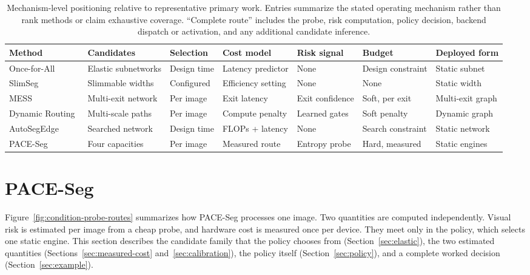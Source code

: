 \documentclass[a4paper,5p]{elsarticle}
\newcommand{\method}{PACE-Seg}
\begin{document}
\begin{table}[!t]
\centering
\caption{Mechanism-level positioning relative to representative primary work. Entries summarize the stated operating mechanism rather than rank methods or claim exhaustive coverage. ``Complete route'' includes the probe, risk computation, policy decision, backend dispatch or activation, and any additional candidate inference.}
\label{tab:related-positioning}
\footnotesize
\setlength{\tabcolsep}{3pt}
\begin{tabular*}{\textwidth}{@{\extracolsep{\fill}}lllllll@{}}
\toprule
Method & Candidates & Selection & Cost model & Risk signal & Budget & Deployed form \\
\midrule
Once-for-All~\cite{cai2020ofa} & Elastic subnetworks & Design time & Latency predictor & None & Design constraint & Static subnet \\
SlimSeg~\cite{xue2022slimseg} & Slimmable widths & Configured & Efficiency setting & None & None & Static width \\
MESS~\cite{kouris2022mess} & Multi-exit network & Per image & Exit latency & Exit confidence & Soft, per exit & Multi-exit graph \\
Dynamic Routing~\cite{li2020dynamic} & Multi-scale paths & Per image & Compute penalty & Learned gates & Soft penalty & Dynamic graph \\
AutoSegEdge~\cite{dou2023autosegedge} & Searched network & Design time & FLOPs + latency & None & Search constraint & Static network \\
\method{} & Four capacities & Per image & Measured route & Entropy probe & Hard, measured & Static engines \\
\bottomrule
\end{tabular*}
\end{table}

\section{PACE-Seg}
\label{sec:method}

Figure~\ref{fig:condition-probe-routes} summarizes how \method{} processes one image. Two quantities are computed independently. Visual risk is estimated per image from a cheap probe, and hardware cost is measured once per device. They meet only in the policy, which selects one static engine. This section describes the candidate family that the policy chooses from (Section~\ref{sec:elastic}), the two estimated quantities (Sections~\ref{sec:measured-cost} and~\ref{sec:calibration}), the policy itself (Section~\ref{sec:policy}), and a complete worked decision (Section~\ref{sec:example}).
\end{document}
